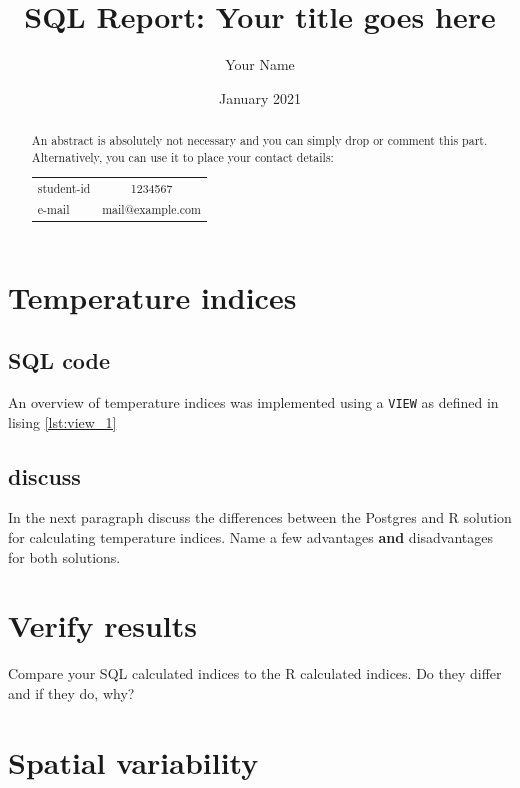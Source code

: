 \documentclass[11pt]{scrartcl}
\title{SQL Report: Your title goes here}
\author{Your Name}
\date{January 2021}
\newcommand\wordcount[1]{
    \immediate\write18{texcount -sum=[1,0,0] -sub=section #1.tex  | grep "Section" | sed -e 's/+.*//' | sed -n \thesection p > ./\jobname-words.sum}%
    \medskip\par words
}
\begin{document}
\maketitle

\begin{abstract}
    An abstract is absolutely not necessary and you can simply drop or comment this part.
    Alternatively, you can use it to place your contact details:\medskip\par 
    \begin{tabular}{lc}
       student-id  & 1234567 \\
        e-mail & mail@example.com
    \end{tabular}
\end{abstract}

\section{Temperature indices}

\subsection{SQL code}
An overview of temperature indices was implemented using a \texttt{VIEW} as defined in lising \ref{lst:view_1}



\subsection{discuss}

In the next paragraph discuss the differences between the Postgres and R solution for calculating temperature indices. 
Name a few advantages \textbf{and} disadvantages for both solutions. 



\section{Verify results}

Compare your SQL calculated indices to the R calculated indices. Do they differ and if they do, why?


\section{Spatial variability}
\end{document}
